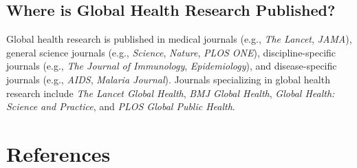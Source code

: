 \documentclass[
  letterpaper,
  DIV=11,
  numbers=noendperiod,
  oneside]{scrreprt}
\begin{document}
\hypertarget{where-is-global-health-research-published}{%
\section{Where is Global Health Research
Published?}\label{where-is-global-health-research-published}}


Global health research is published in medical journals (e.g., \emph{The
Lancet}, \emph{JAMA}), general science journals (e.g., \emph{Science},
\emph{Nature}, \emph{PLOS ONE}), discipline-specific journals (e.g.,
\emph{The Journal of Immunology}, \emph{Epidemiology}), and
disease-specific journals (e.g., \emph{AIDS}, \emph{Malaria Journal}).
Journals specializing in global health research include \emph{The Lancet
Global Health}, \emph{BMJ Global Health}, \emph{Global Health: Science
and Practice}, and \emph{PLOS Global Public Health}.

\hypertarget{references}{%
\chapter*{References}\label{references}}
\end{document}
